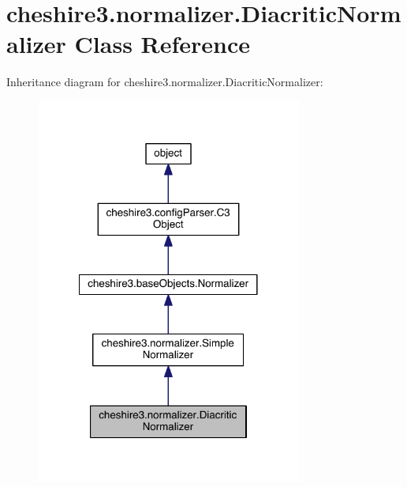 \hypertarget{classcheshire3_1_1normalizer_1_1_diacritic_normalizer}{\section{cheshire3.\-normalizer.\-Diacritic\-Normalizer Class Reference}
\label{classcheshire3_1_1normalizer_1_1_diacritic_normalizer}
}


Inheritance diagram for cheshire3.\-normalizer.\-Diacritic\-Normalizer\-:
\nopagebreak
\begin{figure}[H]
\begin{center}
\leavevmode
\includegraphics[width=248pt]{classcheshire3_1_1normalizer_1_1_diacritic_normalizer__inherit__graph}
\end{center}
\end{figure}


